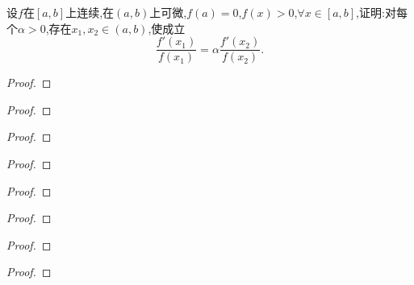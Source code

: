 \documentclass[lang=cn,newtx,10pt,scheme=chinese]{../Template/elegantbook}
\begin{document}
\begin{exercise}
    设\(f\)在\([a,b]\)上连续,在\((a,b)\)上可微,\(f(a)=0\),\(f(x)>0\),\(\forall x\in[a,b]\),证明:对每个\(\alpha>0\),存在\(x_1,x_2\in(a,b)\),使成立
    \[
    \frac{f'(x_1)}{f(x_1)}=\alpha\frac{f'(x_2)}{f(x_2)}.
    \]
\end{exercise}
\begin{proof}
    
\end{proof}

\begin{exercise}

\end{exercise}
\begin{proof}
    
\end{proof}

\begin{exercise}

\end{exercise}
\begin{proof}
    
\end{proof}

\begin{exercise}

\end{exercise}
\begin{proof}
    
\end{proof}

\begin{exercise}

\end{exercise}
\begin{proof}
    
\end{proof}

\begin{exercise}

\end{exercise}
\begin{proof}
    
\end{proof}

\begin{exercise}

\end{exercise}
\begin{proof}
    
\end{proof}

\begin{exercise}

\end{exercise}
\begin{proof}
    
\end{proof}
\end{document}
